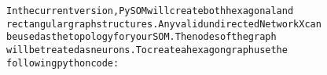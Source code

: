 {{\begin{tabbing}
{\texttt{In\hspace{6pt}the\hspace{6pt}current\hspace{6pt}version,\hspace{6pt}PySOM\hspace{6pt}will\hspace{6pt}create\hspace{6pt}both\hspace{6pt}hexagonal\hspace{6pt}and}}\\
{\texttt{rectangular\hspace{6pt}graph\hspace{6pt}structures.\hspace{12pt}Any\hspace{6pt}valid\hspace{6pt}undirected\hspace{6pt}NetworkX\hspace{6pt}can}}\\
{\texttt{be\hspace{6pt}used\hspace{6pt}as\hspace{6pt}the\hspace{6pt}topology\hspace{6pt}for\hspace{6pt}your\hspace{6pt}SOM.\hspace{12pt}The\hspace{6pt}nodes\hspace{6pt}of\hspace{6pt}the\hspace{6pt}graph}}\\
{\texttt{will\hspace{6pt}be\hspace{6pt}treated\hspace{6pt}as\hspace{6pt}neurons.\hspace{12pt}To\hspace{6pt}create\hspace{6pt}a\hspace{6pt}hexagon\hspace{6pt}graph\hspace{6pt}use\hspace{6pt}the}}\\
{\texttt{following\hspace{6pt}python\hspace{6pt}code:}}\\

\end{tabbing}}}
